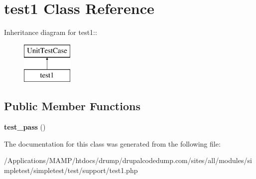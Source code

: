 \hypertarget{classtest1}{
\section{test1 Class Reference}
\label{classtest1}
}
Inheritance diagram for test1::\begin{figure}[H]
\begin{center}
\leavevmode
\includegraphics[height=2cm]{classtest1}
\end{center}
\end{figure}
\subsection*{Public Member Functions}
\begin{DoxyCompactItemize}
\item 
\hypertarget{classtest1_a9340cb6cb1c8266974c3132a7c8af9ba}{
{\bfseries test\_\-pass} ()}
\label{classtest1_a9340cb6cb1c8266974c3132a7c8af9ba}

\end{DoxyCompactItemize}


The documentation for this class was generated from the following file:\begin{DoxyCompactItemize}
\item 
/Applications/MAMP/htdocs/drump/drupalcodedump.com/sites/all/modules/simpletest/simpletest/test/support/test1.php\end{DoxyCompactItemize}
